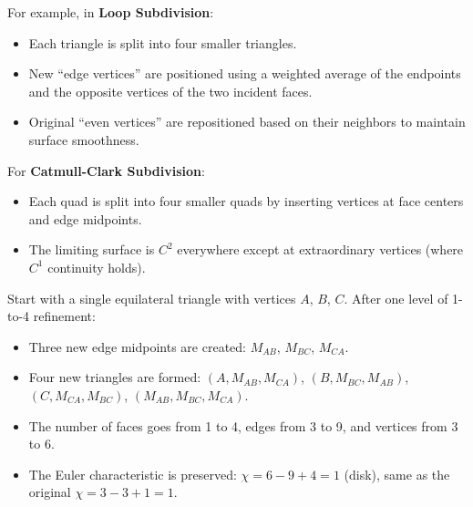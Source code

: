 For example, in \textbf{Loop Subdivision}\cite{loop1987}:
\begin{itemize}
\item Each triangle is split into four smaller triangles.
\item New ``edge vertices'' are positioned using a weighted average of the endpoints and the opposite vertices of the two incident faces.
\item Original ``even vertices'' are repositioned based on their neighbors to maintain surface smoothness.
\end{itemize}

For \textbf{Catmull-Clark Subdivision}\cite{catmull1978}:
\begin{itemize}
\item Each quad is split into four smaller quads by inserting vertices at face centers and edge midpoints.
\item The limiting surface is $C^2$ everywhere except at extraordinary vertices (where $C^1$ continuity holds).
\end{itemize}

\begin{example}\label{ex:triangle_refinement}
Start with a single equilateral triangle with vertices $A$, $B$, $C$. After one level of 1-to-4 refinement:
\begin{itemize}
    \item Three new edge midpoints are created: $M_{AB}$, $M_{BC}$, $M_{CA}$.
    \item Four new triangles are formed: $(A, M_{AB}, M_{CA})$, $(B, M_{BC}, M_{AB})$, $(C, M_{CA}, M_{BC})$, $(M_{AB}, M_{BC}, M_{CA})$.
    \item The number of faces goes from 1 to 4, edges from 3 to 9, and vertices from 3 to 6.
    \item The Euler characteristic is preserved: $\chi = 6 - 9 + 4 = 1$ (disk), same as the original $\chi = 3 - 3 + 1 = 1$.
\end{itemize}
\end{example}



